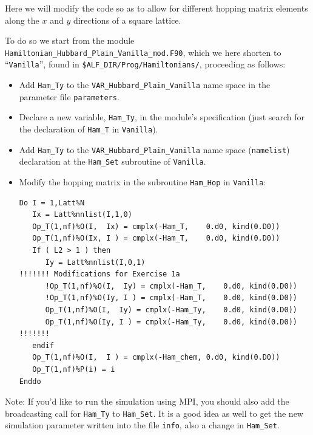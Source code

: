 \documentclass[10pt,modern]{scrartcl}
\numberwithin{exerciseitem}{exercise} %
\begin{document}



Here we will modify the code  so as to allow  for different hopping matrix elements along the $x$ and $y$ directions of a square lattice.

To do so we start from the module \texttt{Hamiltonian\_Hubbard\_Plain\_Vanilla\_mod.F90}, which we here shorten to ``\texttt{Vanilla}'', found in \texttt{\$ALF\_DIR/Prog/Hamiltonians/}, proceeding as follows: 
\begin{itemize}
	\item Add \texttt{Ham\_Ty} to the \texttt{VAR\_Hubbard\_Plain\_Vanilla} name space in the parameter file \texttt{parameters}.
	\item Declare a new variable, \texttt{Ham\_Ty}, in the module's specification (just search for the declaration of \texttt{Ham\_T} in \texttt{Vanilla}).
	\item Add \texttt{Ham\_Ty} to the \texttt{VAR\_Hubbard\_Plain\_Vanilla} name space (\texttt{namelist}) declaration at the \texttt{Ham\_Set} subroutine of \texttt{Vanilla}.
	\item Modify the hopping matrix in the subroutine \texttt{Ham\_Hop} in \texttt{Vanilla}:
\begin{lstlisting}[style=fortran]
Do I = 1,Latt%N
   Ix = Latt%nnlist(I,1,0)
   Op_T(1,nf)%O(I,  Ix) = cmplx(-Ham_T,    0.d0, kind(0.D0))
   Op_T(1,nf)%O(Ix, I ) = cmplx(-Ham_T,    0.d0, kind(0.D0))
   If ( L2 > 1 ) then
      Iy = Latt%nnlist(I,0,1)
!!!!!!! Modifications for Exercise 1a
      !Op_T(1,nf)%O(I,  Iy) = cmplx(-Ham_T,    0.d0, kind(0.D0))
      !Op_T(1,nf)%O(Iy, I ) = cmplx(-Ham_T,    0.d0, kind(0.D0))
      Op_T(1,nf)%O(I,  Iy) = cmplx(-Ham_Ty,    0.d0, kind(0.D0))
      Op_T(1,nf)%O(Iy, I ) = cmplx(-Ham_Ty,    0.d0, kind(0.D0))
!!!!!!!
   endif
   Op_T(1,nf)%O(I,  I ) = cmplx(-Ham_chem, 0.d0, kind(0.D0))
   Op_T(1,nf)%P(i) = i 
Enddo
\end{lstlisting} 
\end{itemize}
Note: If you'd like to run the simulation using MPI, you should also add the broadcasting call for \texttt{Ham\_Ty} to \texttt{Ham\_Set}. It is a good idea as well to get the new simulation parameter written into the file \texttt{info}, also a change in \texttt{Ham\_Set}.
\end{document}
